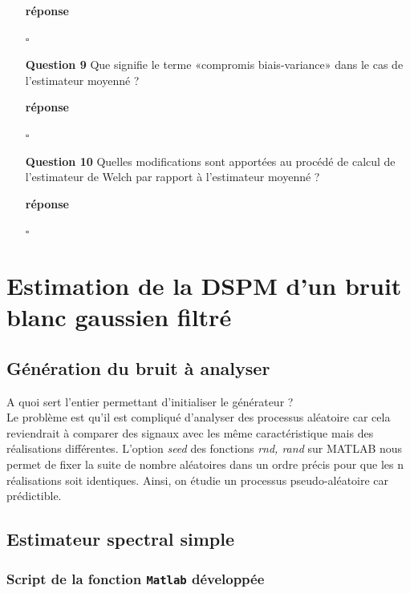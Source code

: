 \documentclass{article}
\newcommand{\debutrep}[1]{\color{blue}\begin{center} \hrulefill \textbf{ #1 } \hrulefill \end{center} }
\newcommand{\finrep}{\vspace*{5mm}\hfill $\square$\color{black}\vspace*{5mm}}
\begin{document}
\begin{itemize}
\debutrep{réponse}

\finrep

\item[{\bf Question 9}] Que signifie le terme «compromis biais-variance» dans le cas de l’estimateur moyenné ?

\debutrep{réponse}

\finrep

\item[{\bf Question 10}] Quelles modifications sont apportées au procédé de calcul de l’estimateur de Welch par rapport à l’estimateur moyenné ?

\debutrep{réponse}

\finrep

\end{itemize}

\clearpage
\setcounter{section}{2}
\section{Estimation de la DSPM d'un bruit blanc gaussien filtré}
\subsection{Génération du bruit à analyser}

A quoi sert l'entier permettant d'initialiser le générateur ?\\

Le problème est qu'il est compliqué d'analyser des processus aléatoire car cela reviendrait à comparer des signaux avec les même caractéristique mais des réalisations différentes. L'option \textit{seed} des fonctions \textit{rnd, rand} sur MATLAB nous permet de fixer la suite de nombre aléatoires dans un ordre précis pour que les n réalisations soit identiques. Ainsi, on étudie un processus pseudo-aléatoire car prédictible.

\subsection{Estimateur spectral simple}
\subsubsection{Script de la fonction {\tt Matlab} développée}
\end{document}
